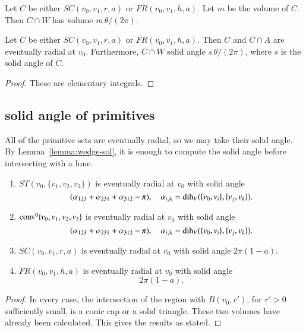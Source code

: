 \begin{lemma}  Let $C$ be either $SC(v_0,v_1,r,a)$ or
   $FR(v_0,v_1,h,a)$.  Let $m$ be the volume of $C$.  
   Then $C\cap W$ has volume $m\,\theta/(2\pi)$.   
\end{lemma}

\begin{lemma}  Let $C$ be either $SC(v_0,v_1,r,a)$ or
   $FR(v_0,v_1,h,a)$.  Then $C$ and $C\cap A$ are eventually 
radial at $v_0$. Furthermore,
    $C\cap W$ solid angle 
  $s\,\theta/(2\pi)$, where $s$ is the solid angle of $C$.
\end{lemma}


\begin{proof}
These are elementary integrals.
\end{proof}


\subsection{solid angle of primitives}

All of the primitive sets are eventually radial, so we may take their
solid angle.  By Lemma~\ref{lemma:wedge-sol}, it is enough to compute
the solid angle before intersecting with a lune.

\begin{lemma} 
\begin{enumerate}
    \item  $ST(v_0,\{v_1,v_2,v_3\})$ is eventually radial at $v_0$
     with solid angle 
     $$
     (\alpha_{123}+\alpha_{231}+\alpha_{312}-\pi),\quad
     \alpha_{ijk}=\operatorname{dih}_V(\{v_0,v_i\},\{v_j,v_k\}).
     $$
    \item ${\operatorname{conv}}^0\{v_0,v_1,v_2,v_3\}$ is eventually radial at $v_0$
      with solid angle
           $$
     (\alpha_{123}+\alpha_{231}+\alpha_{312}-\pi),\quad
     \alpha_{ijk}=\operatorname{dih}_V(\{v_0,v_i\},\{v_j,v_k\}).
     $$
    \item $SC(v_0,v_1,r,a)$ is eventually radial at $v_0$ with solid
      angle 
      $2\pi(1-a)$.
    \item $FR(v_0,v_1,h,a)$ is eventually radial at $v_0$ with solid
      angle
        $$
        2\pi (1-a).
        $$
\end{enumerate}
\end{lemma}

\begin{proof} In every case, the intersection of 
  the region with $B(v_0,r')$, for $r'>0$ sufficiently small, is
  a conic cap or a solid triangle.  These two volumes have
  already been calculated.  This gives the results as stated.
\end{proof}

